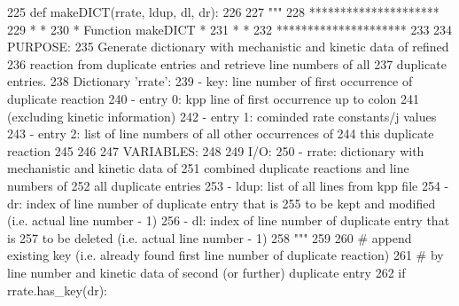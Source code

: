 \begin{DoxyCode}
225 \textcolor{keyword}{def }makeDICT(rrate, ldup, dl, dr):
226 
227     \textcolor{stringliteral}{"""}
228 \textcolor{stringliteral}{    *********************}
229 \textcolor{stringliteral}{    *                   *}
230 \textcolor{stringliteral}{    * Function makeDICT *}
231 \textcolor{stringliteral}{    *                   *}
232 \textcolor{stringliteral}{    *********************}
233 \textcolor{stringliteral}{}
234 \textcolor{stringliteral}{    PURPOSE:}
235 \textcolor{stringliteral}{        Generate dictionary with mechanistic and kinetic data of refined}
236 \textcolor{stringliteral}{        reaction from duplicate entries and retrieve line numbers of all}
237 \textcolor{stringliteral}{        duplicate entries.}
238 \textcolor{stringliteral}{        Dictionary 'rrate':}
239 \textcolor{stringliteral}{        - key:      line number of first occurrence of duplicate reaction}
240 \textcolor{stringliteral}{        - entry 0:  kpp line of first occurrence up to colon}
241 \textcolor{stringliteral}{                    (excluding kinetic information)}
242 \textcolor{stringliteral}{        - entry 1:  cominded rate constants/j values}
243 \textcolor{stringliteral}{        - entry 2:  list of line numbers of all other occurrences of}
244 \textcolor{stringliteral}{                    this duplicate reaction}
245 \textcolor{stringliteral}{}
246 \textcolor{stringliteral}{}
247 \textcolor{stringliteral}{    VARIABLES:}
248 \textcolor{stringliteral}{}
249 \textcolor{stringliteral}{    I/O:}
250 \textcolor{stringliteral}{        - rrate:    dictionary with mechanistic and kinetic data of}
251 \textcolor{stringliteral}{                    combined duplicate reactions and line numbers of}
252 \textcolor{stringliteral}{                    all duplicate entries}
253 \textcolor{stringliteral}{        - ldup:     list of all lines from kpp file}
254 \textcolor{stringliteral}{        - dr:       index of line number of duplicate entry that is}
255 \textcolor{stringliteral}{                    to be kept and modified (i.e. actual line number - 1)}
256 \textcolor{stringliteral}{        - dl:       index of line number of duplicate entry that is}
257 \textcolor{stringliteral}{                    to be deleted (i.e. actual line number - 1)}
258 \textcolor{stringliteral}{    """}
259 
260 \textcolor{comment}{# append existing key (i.e. already found first line number of duplicate reaction)}
261 \textcolor{comment}{# by line number and kinetic data of second (or further) duplicate entry}
262     \textcolor{keywordflow}{if} rrate.has\_key(dr):

\end{DoxyCode}
